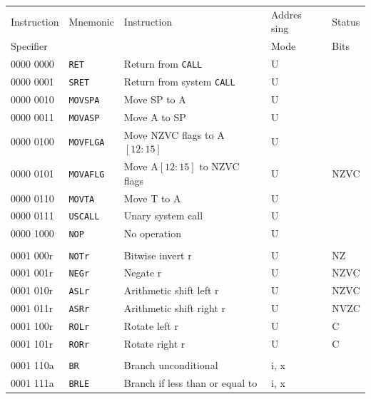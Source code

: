 \documentclass[10pt,fleqn]{book}
\begin{document}
\begin{tabular}{ l l l l l }
\toprule
Instruction & Mnemonic       & Instruction                         & Addres sing                  & Status\\
Specifier   &                &                                      & Mode                        & Bits\\
\midrule

0000 0000   & \verb|RET|     & Return from \verb|CALL|              & U \\
0000 0001   & \verb|SRET|    & Return from system \verb|CALL|       & U \\
0000 0010   & \verb|MOVSPA|  & Move SP to A                         & U \\
0000 0011   & \verb|MOVASP|  & Move A to SP                         & U \\  
0000 0100   & \verb|MOVFLGA| & Move NZVC flags to A$[12:15]$        & U \\
0000 0101   & \verb|MOVAFLG| & Move A$[12:15]$ to NZVC flags        & U                           & NZVC\\
0000 0110   & \verb|MOVTA|   & Move T to A                          & U \\
0000 0111   & \verb|USCALL|  & Unary system call                    & U \\
0000 1000   & \verb|NOP|     & No operation                         & U \\
 \\
0001 000r   & \verb|NOTr|    & Bitwise invert r                     & U                           & NZ \\
0001 001r   & \verb|NEGr|    & Negate r                             & U                           & NZVC \\
0001 010r   & \verb|ASLr|    & Arithmetic shift left r              & U                           & NZVC \\
0001 011r   & \verb|ASRr|    & Arithmetic shift right r             & U                           & NVZC \\
0001 100r   & \verb|ROLr|    & Rotate left r                        & U                           & C \\
0001 101r   & \verb|RORr|    & Rotate right r                       & U                           & C \\
 \\
0001 110a   & \verb|BR|      & Branch unconditional                 & i, x \\
0001 111a   & \verb|BRLE|    & Branch if less than or equal to      & i, x \\ 

\end{tabular}
\end{document}
